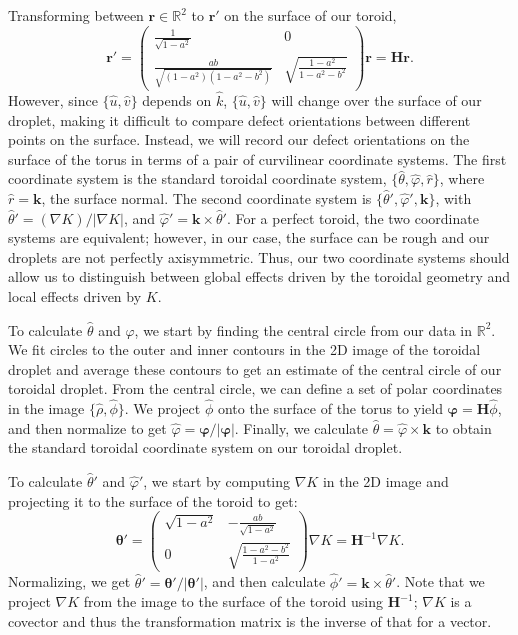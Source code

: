 Transforming between $\mathbf{r} \in \mathbb{R}^2$ to $\mathbf{r}'$ on the surface of our toroid,
\begin{equation}
  \mathbf{r}' =
  \begin{pmatrix}
  \frac{1}{\sqrt{1-a^2}} & 0 \\
  \frac{ab}{\sqrt{(1-a^2)(1-a^2-b^2)}} & \sqrt{\frac{1-a^2}{1-a^2-b^2}}
  \end{pmatrix}
  \mathbf{r} = \bm{H}\mathbf{r}.
\end{equation}
However, since $\{ \hat{u},\hat{v}\}$ depends on $\hat{k}$, $\{ \hat{u},\hat{v}\}$ will change over the surface of our droplet, making it difficult to compare defect orientations between different points on the surface.
Instead, we will record our defect orientations on the surface of the torus in terms of a pair of curvilinear coordinate systems.
The first coordinate system is the standard toroidal coordinate system, $\{\hat{\theta}, \hat{\varphi}, \hat{r}  \}$, where $\hat{r} = \mathbf{k}$, the surface normal.
The second coordinate system is $\{\hat{\theta}', \hat{\varphi}',\mathbf{k} \}$, with $\hat{\theta}' = (\nabla K)/|\nabla K|$, and $\hat{\varphi}' = \mathbf{k} \times \hat{\theta}'$.
For a perfect toroid, the two coordinate systems are equivalent; however, in our case, the surface can be rough and our droplets are not perfectly axisymmetric.
Thus, our two coordinate systems should allow us to distinguish between global effects driven by the toroidal geometry and local effects driven by $K$.

To calculate $\hat{\theta}$ and $\hat{\varphi}$, we start by finding the central circle from our data in $\mathbb{R}^2$.
We fit circles to the outer and inner contours in the 2D image of the toroidal droplet and average these contours to get an estimate of the central circle of our toroidal droplet.
From the central circle, we can define a set of polar coordinates in the image $\{\hat{\rho}, \hat{\phi}\}$.
We project $\hat{\phi}$ onto the surface of the torus to yield $\bm{\varphi} = \bm{H}\hat{\phi}$, and then normalize to get $\hat{\varphi} = \bm{\varphi}/|\bm{\varphi}|$.
Finally, we calculate $\hat{\theta} =  \hat{\varphi} \times \mathbf{k}$ to obtain the standard toroidal coordinate system on our toroidal droplet.

To calculate $\hat{\theta}'$ and $\hat{\varphi}'$, we start by computing $\nabla K$ in the 2D image and projecting it to the surface of the toroid to get:
\begin{equation}
  \bm{\theta}' =
  \begin{pmatrix}
    \sqrt{1-a^2} & -\frac{ab}{\sqrt{1-a^2}} \\
    0 & \sqrt{\frac{1-a^2-b^2}{1-a^2}}
  \end{pmatrix}
  \nabla K = \bm{H}^{-1} \nabla K.
\end{equation}
Normalizing, we get $\hat{\theta}' = \bm{\theta}'/|\bm{\theta}'|$, and then calculate $\hat{\phi}' = \mathbf{k} \times \hat{\theta}'$.
Note that we project $\nabla K$ from the image to the surface of the toroid using $\bm{H}^{-1}$; $\nabla K$ is a covector and thus the transformation matrix is the inverse of that for a vector.

